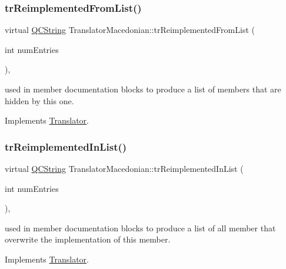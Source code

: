 \subsubsection{\texorpdfstring{trReimplementedFromList()}{trReimplementedFromList()}}
{\footnotesize\ttfamily virtual \mbox{\hyperlink{class_q_c_string}{Q\+C\+String}} Translator\+Macedonian\+::tr\+Reimplemented\+From\+List (\begin{DoxyParamCaption}\item[{int}]{num\+Entries }\end{DoxyParamCaption})\hspace{0.3cm}{\ttfamily [inline]}, {\ttfamily [virtual]}}

used in member documentation blocks to produce a list of members that are hidden by this one. 

Implements \mbox{\hyperlink{class_translator}{Translator}}.

\mbox{\label{class_translator_macedonian_aa3346ed3d122c5e026ff7ecfb8e13d3b}} 
\subsubsection{\texorpdfstring{trReimplementedInList()}{trReimplementedInList()}}
{\footnotesize\ttfamily virtual \mbox{\hyperlink{class_q_c_string}{Q\+C\+String}} Translator\+Macedonian\+::tr\+Reimplemented\+In\+List (\begin{DoxyParamCaption}\item[{int}]{num\+Entries }\end{DoxyParamCaption})\hspace{0.3cm}{\ttfamily [inline]}, {\ttfamily [virtual]}}

used in member documentation blocks to produce a list of all member that overwrite the implementation of this member. 

Implements \mbox{\hyperlink{class_translator}{Translator}}.

\mbox{\label{class_translator_macedonian_a9b57af53a897c8b7ef22a2b5bc03f75e}} 
